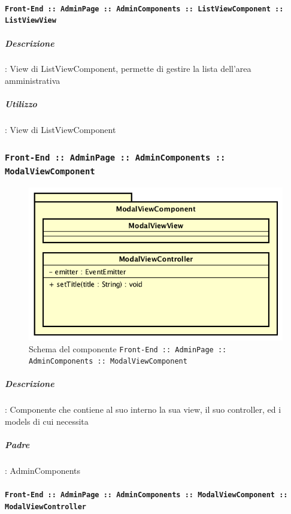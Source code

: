\documentclass[../DefinizioneDiProdotto_v2.0.0.tex]{subfiles}
\begin{document}
			      \paragraph{\texttt{Front-End :: AdminPage :: AdminComponents :: ListViewComponent :: ListViewView}}
			      	\subparagraph{Descrizione}: View di ListViewComponent, permette di gestire la lista dell'area amministrativa
			      	\subparagraph{Utilizzo}: View di ListViewComponent
\newpage
	\subsubsection{\texttt{Front-End :: AdminPage :: AdminComponents :: ModalViewComponent}}
	\begin{figure}[!h]
		\centering
		\includegraphics[scale=0.6]{Architettura/Front-End/AdminPage/AdminComponents/ModalViewComponent.png}
		\caption{Schema del componente \texttt{Front-End :: AdminPage :: AdminComponents :: ModalViewComponent}}
	\end{figure}

			\subparagraph{Descrizione}: Componente che contiene al suo interno la sua view, il suo controller, ed i models di cui necessita
			\subparagraph{Padre}: AdminComponents
				\paragraph{\texttt{Front-End :: AdminPage :: AdminComponents :: ModalViewComponent :: ModalViewController}}
\end{document}
